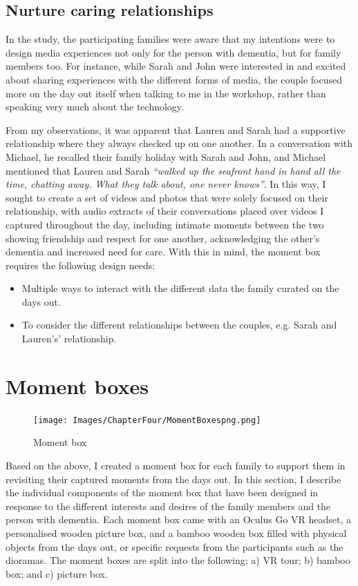 \subsection{Nurture caring relationships}
\label{CaringRelationships}
In the study, the participating families were aware that my intentions were to design media experiences not only for the person with dementia, but for family members too. For instance, while Sarah and John were interested in and excited about sharing experiences with the different forms of media, the couple focused more on the day out itself when talking to me in the workshop, rather than speaking very much about the technology.

From my observations, it was apparent that Lauren and Sarah had a supportive relationship where they always checked up on one another. In a conversation with Michael, he recalled their family holiday with Sarah and John, and Michael mentioned that Lauren and Sarah \textit{``walked up the seafront hand in hand all the time, chatting away. What they talk about, one never knows''}. In this way, I sought to create a set of videos and photos that were solely focused on their relationship, with audio extracts of their conversations placed over videos I captured throughout the day, including intimate moments between the two showing friendship and respect for one another, acknowledging the other's dementia and increased need for care. With this in mind, the moment box requires the following design needs:

\begin{itemize}
    \item Multiple ways to interact with the different data the family curated on the days out.
    \item To consider the different relationships between the couples, e.g. Sarah and Lauren's' relationship.
\end{itemize}


\section{Moment boxes}
\label{MomentBoxes}

\begin{figure}[htp]
\centering
\texttt{[image: Images/ChapterFour/MomentBoxespng.png]}
\caption{Moment box}
\label{fig:MomentBoxes}
\end{figure}

Based on the above, I created a moment box for each family to support them in revisiting their captured moments from the days out. In this section, I describe the individual components of the moment box that have been designed in response to the different interests and desires of the family members and the person with dementia. Each moment box came with an Oculus Go VR headset, a personalised wooden picture box, and a bamboo wooden box filled with physical objects from the days out, or specific requests from the participants such as the dioramas. The moment boxes are split into the following: a) VR tour; b) bamboo box; and c) picture box.

